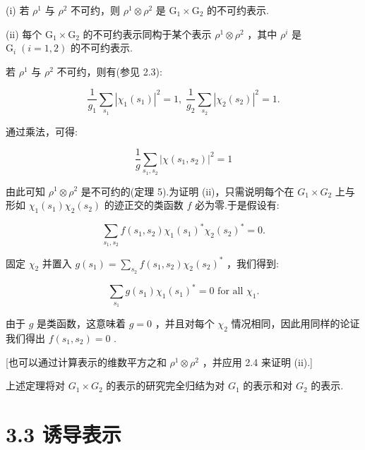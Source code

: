 \documentclass[10pt]{article}
\begin{document}
(i) 若 \({\rho }^{1}\) 与 \({\rho }^{2}\) 不可约，则 \({\rho }^{1} \otimes  {\rho }^{2}\) 是 \({\mathrm{G}}_{1} \times  {\mathrm{G}}_{2}\) 的不可约表示.

(ii) 每个 \({\mathrm{G}}_{1} \times  {\mathrm{G}}_{2}\) 的不可约表示同构于某个表示 \({\rho }^{1} \otimes  {\rho }^{2}\) ，其中 \({\rho }^{i}\) 是 \({\mathrm{G}}_{i} \; \left( {i = 1,2}\right)\) 的不可约表示.

若 \({\rho }^{1}\) 与 \({\rho }^{2}\) 不可约，则有(参见 2.3):

\[
\frac{1}{{g}_{1}}\mathop{\sum }\limits_{{s}_{1}}{\left| {\chi }_{1}\left( {s}_{1}\right) \right| }^{2} = 1,\;\frac{1}{{g}_{2}}\mathop{\sum }\limits_{{s}_{2}}{\left| {\chi }_{2}\left( {s}_{2}\right) \right| }^{2} = 1.
\]

通过乘法，可得:

\[
\frac{1}{g}\mathop{\sum }\limits_{{{s}_{1},{s}_{2}}}{\left| \chi \left( {s}_{1},{s}_{2}\right) \right| }^{2} = 1
\]

由此可知 \({\rho }^{1} \otimes  {\rho }^{2}\) 是不可约的(定理 5).为证明 (ii)，只需说明每个在 \({G}_{1} \times  {G}_{2}\) 上与形如 \({\chi }_{1}\left( {s}_{1}\right) {\chi }_{2}\left( {s}_{2}\right)\) 的迹正交的类函数 \(f\) 必为零.于是假设有:

\[
\mathop{\sum }\limits_{{{s}_{1},{s}_{2}}}f\left( {{s}_{1},{s}_{2}}\right) {\chi }_{1}{\left( {s}_{1}\right) }^{ * }{\chi }_{2}{\left( {s}_{2}\right) }^{ * } = 0.
\]

固定 \({\chi }_{2}\) 并置入 \(g\left( {s}_{1}\right)  = \mathop{\sum }\limits_{{s}_{2}}f\left( {{s}_{1},{s}_{2}}\right) {\chi }_{2}{\left( {s}_{2}\right) }^{ * }\) ，我们得到:

\[
\mathop{\sum }\limits_{{s}_{1}}g\left( {s}_{1}\right) {\chi }_{1}{\left( {s}_{1}\right) }^{ * } = 0\text{ for all }{\chi }_{1}.
\]

由于 \(g\) 是类函数，这意味着 \(g = 0\) ，并且对每个 \({\chi }_{2}\) 情况相同，因此用同样的论证我们得出 \(f\left( {{s}_{1},{s}_{2}}\right)  = 0\) .

[也可以通过计算表示的维数平方之和 \({\rho }^{1} \otimes  {\rho }^{2}\) ，并应用 2.4 来证明 (ii).]

上述定理将对 \({G}_{1} \times  {G}_{2}\) 的表示的研究完全归结为对 \({G}_{1}\) 的表示和对 \({G}_{2}\) 的表示.

\section*{3.3 诱导表示}
\end{document}
